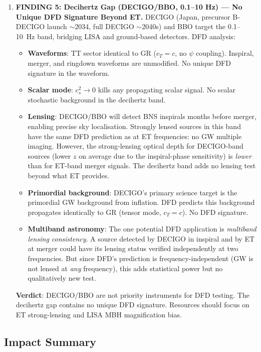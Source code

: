 \documentclass[11pt]{article}
\theoremstyle{definition}
\theoremstyle{remark}
\begin{document}
\begin{tcolorbox}[colback=blue!5!white, colframe=blue!60!black,
  title=\textbf{TOP 5 FINDINGS --- W4i17 P6 (Ranked by Impact)}]
\begin{enumerate}[nosep]
\item \textbf{FINDING 5: Decihertz Gap (DECIGO/BBO, 0.1--10 Hz) ---
  No Unique DFD Signature Beyond ET.}
  DECIGO (Japan, precursor B-DECIGO launch $\sim$2034, full DECIGO
  $\sim$2040s) and BBO target the 0.1--10~Hz band, bridging LISA
  and ground-based detectors. DFD analysis:
  \begin{itemize}[nosep]
  \item \textbf{Waveforms}: TT sector identical to GR ($c_T = c$, no
    $\psi$ coupling). Inspiral, merger, and ringdown waveforms are
    unmodified. No unique DFD signature in the waveform.
  \item \textbf{Scalar mode}: $c_s^2 \to 0$ kills any propagating
    scalar signal. No scalar stochastic background in the decihertz
    band.
  \item \textbf{Lensing}: DECIGO/BBO will detect BNS inspirals months
    before merger, enabling precise sky localisation. Strongly lensed
    sources in this band have the same DFD prediction as at ET
    frequencies: no GW multiple imaging. However, the strong-lensing
    optical depth for DECIGO-band sources (lower $z$ on average due to
    the inspiral-phase sensitivity) is \emph{lower} than for ET-band
    merger signals. The decihertz band adds no lensing test beyond
    what ET provides.
  \item \textbf{Primordial background}: DECIGO's primary science target
    is the primordial GW background from inflation. DFD predicts this
    background propagates identically to GR (tensor mode, $c_T = c$).
    No DFD signature.
  \item \textbf{Multiband astronomy}: The one potential DFD application
    is \emph{multiband lensing consistency}. A source detected by
    DECIGO in inspiral and by ET at merger could have its lensing status
    verified independently at two frequencies. But since DFD's prediction
    is frequency-independent (GW is not lensed at \emph{any} frequency),
    this adds statistical power but no qualitatively new test.
  \end{itemize}
  \textbf{Verdict}: DECIGO/BBO are not priority instruments for DFD
  testing. The decihertz gap contains no unique DFD signature. Resources
  should focus on ET strong-lensing and LISA MBH magnification bias.

\end{enumerate}
\end{tcolorbox}

\subsection*{Impact Summary}
\end{document}

